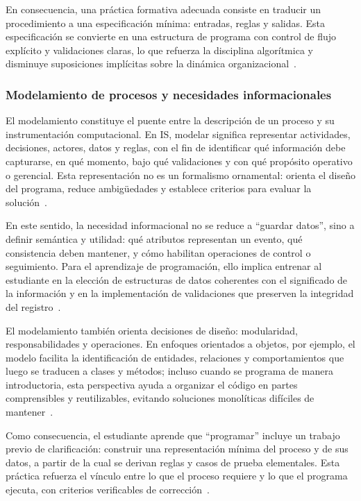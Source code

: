 \documentclass[12pt,twoside]{book}
\begin{document}
						En consecuencia, una práctica formativa adecuada consiste en traducir un procedimiento a una especificación mínima: entradas, reglas y salidas. Esta especificación se convierte en una estructura de programa con control de flujo explícito y validaciones claras, lo que refuerza la disciplina algorítmica y disminuye suposiciones implícitas sobre la dinámica organizacional~\cite{Wirth1976Algorithms,Ghezzi2003Fundamentals,ISO247722024Programming}.
						
					\subsubsection{Modelamiento de procesos y necesidades informacionales}
						\noindent
						El modelamiento constituye el puente entre la descripción de un proceso y su instrumentación computacional. En IS, modelar significa representar actividades, decisiones, actores, datos y reglas, con el fin de identificar qué información debe capturarse, en qué momento, bajo qué validaciones y con qué propósito operativo o gerencial. Esta representación no es un formalismo ornamental: orienta el diseño del programa, reduce ambigüedades y establece criterios para evaluar la solución~\cite{Kendall2014Systems,Tegarden2025Systems,Laudon2020Management}.
						
						En este sentido, la necesidad informacional no se reduce a “guardar datos”, sino a definir semántica y utilidad: qué atributos representan un evento, qué consistencia deben mantener, y cómo habilitan operaciones de control o seguimiento. Para el aprendizaje de programación, ello implica entrenar al estudiante en la elección de estructuras de datos coherentes con el significado de la información y en la implementación de validaciones que preserven la integridad del registro~\cite{Laudon2020Management,Bernstein2009Data,Calzati2025Ecosystemic}.
						
						El modelamiento también orienta decisiones de diseño: modularidad, responsabilidades y operaciones. En enfoques orientados a objetos, por ejemplo, el modelo facilita la identificación de entidades, relaciones y comportamientos que luego se traducen a clases y métodos; incluso cuando se programa de manera introductoria, esta perspectiva ayuda a organizar el código en partes comprensibles y reutilizables, evitando soluciones monolíticas difíciles de mantener~\cite{Booch2007Object,Tegarden2025Systems,Ghezzi2003Fundamentals}.
						
						Como consecuencia, el estudiante aprende que “programar” incluye un trabajo previo de clarificación: construir una representación mínima del proceso y de sus datos, a partir de la cual se derivan reglas y casos de prueba elementales. Esta práctica refuerza el vínculo entre lo que el proceso requiere y lo que el programa ejecuta, con criterios verificables de corrección~\cite{Hanly2015Problem,Gaddis2022Starting,Kendall2014Systems}.
						
\end{document}
